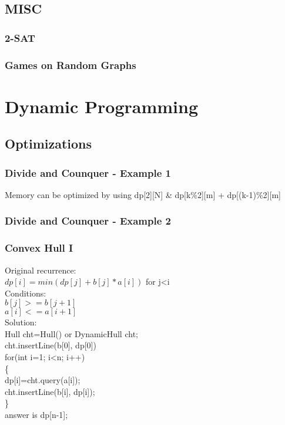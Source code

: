 \documentclass[10pt,a4paper]{report}
\newcommand\tab[1][1cm]{\hspace*{#1}}
\begin{document}
	\newpage	
	\section{MISC}
		\subsection{2-SAT}
			
		\newpage
		\subsection{Games on Random Graphs}
			
		
\chapter{Dynamic Programming}

	\section{Optimizations}
		\subsection{Divide and Counquer - Example 1}
			Memory can be optimized by using dp[2][N] \& dp[k\%2][m] + dp[(k-1)\%2][m]\\
			
		\newpage
		\subsection{Divide and Counquer - Example 2}
			
		\newpage
		\subsection{Convex Hull I}
			Original recurrence:\\
			\tab $dp[i]=min(dp[j]+b[j]*a[i])$ for j<i\\
			Conditions:\\
			\tab $b[j]>=b[j+1]$\\
			\tab $a[i]<=a[i+1]$\\
			Solution:\\
			Hull cht=Hull() or DynamicHull cht;\\
			cht.insertLine(b[0], dp[0])\\
			for(int i=1; i<n; i++)\\
			\{\\
				\tab dp[i]=cht.query(a[i]);\\
				\tab cht.insertLine(b[i], dp[i]);\\
			\}\\
			answer is dp[n-1];
\end{document}

